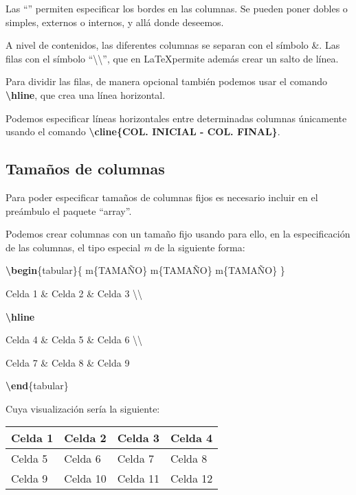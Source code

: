 Las ``\vline'' permiten especificar los bordes en las columnas. Se pueden poner dobles o simples, externos o internos, y allá donde deseemos.

A nivel de contenidos, las diferentes columnas se separan con el símbolo \&. Las filas con el símbolo ``\textbackslash\textbackslash'', que en \LaTeX permite además crear un salto de línea.

Para dividir las filas, de manera opcional también podemos usar el comando \textbf{\textbackslash hline}, que crea una línea horizontal.

Podemos especificar líneas horizontales entre determinadas columnas únicamente usando el comando \textbf{\textbackslash cline\{COL. INICIAL - COL. FINAL\}}.

\subsection{Tamaños de columnas}

Para poder especificar tamaños de columnas fijos es necesario incluir en el preámbulo el paquete ``array''.

Podemos crear columnas con un tamaño fijo usando para ello, en la especificación de las columnas, el tipo especial \emph{m} de la siguiente forma:

\textbf{\textbackslash begin}\{tabular\}\{ m\{TAMAÑO\} \vline m\{TAMAÑO\} \vline m\{TAMAÑO\} \}

 Celda 1 \& Celda 2 \& Celda 3 \textbackslash\textbackslash
 
 \textbf{\textbackslash hline}
 
 Celda 4 \& Celda 5 \& Celda 6 \textbackslash\textbackslash
 
 Celda 7 \& Celda 8 \& Celda 9
  
\textbf{\textbackslash end}\{tabular\}

Cuya visualización sería la siguiente: %

\begin{tabular}{ m{2.5cm}|m{25mm}|m{40pt}|m{} }
 Celda 1 & Celda 2 & Celda 3 & Celda 4 \\
 \hline
 Celda 5 & Celda 6 & Celda 7 & Celda 8 \\  
 Celda 9 & Celda 10 & Celda 11 & Celda 12   
\end{tabular}

